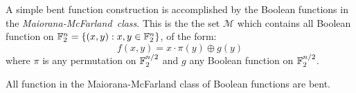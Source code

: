 
\par A simple bent function construction is accomplished by the Boolean functions
in the {\em Maiorana-McFarland\ class}. This is the the set $\mathcal{M}$ which
contains all Boolean function on $\mathbb{F}_2^n=\{(x,y):x,y\in\mathbb{F}_2^n\}$, of the form:
  \[
  f(x,y)=x\cdot\pi(y)\oplus g(y)
  \]
where $\pi$ is any permutation on $\mathbb{F}_2^{n/2}$ and $g$ any Boolean function on
$\mathbb{F}_2^{n/2}$.

\par All function in the Maiorana-McFarland class of Boolean functions are bent.
